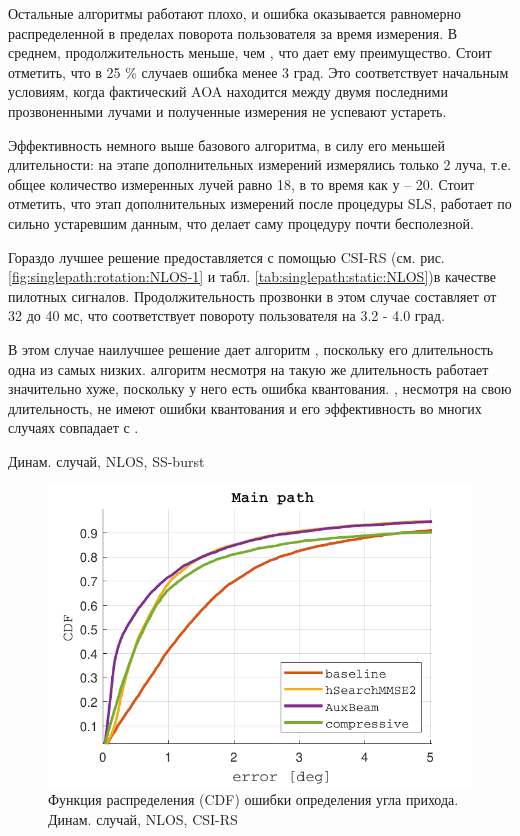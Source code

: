 Остальные алгоритмы работают плохо, и ошибка оказывается равномерно
распределенной в пределах поворота пользователя за время измерения.  В среднем,
продолжительность \AuxBeam{} меньше, чем \hSearchMMSE{}, что дает
ему преимущество. Стоит отметить, что в 25 \% случаев ошибка \AuxBeam{}
менее 3 град. Это соответствует начальным условиям, когда фактический AOA
находится между двумя последними прозвоненными лучами и полученные измерения не успевают
устареть.

Эффективность \hSearchMMSE{} немного выше базового алгоритма, в силу 
его меньшей длительности: на этапе дополнительных измерений измерялись только 2 луча,
т.е. общее количество измеренных лучей равно 18, в то время как у \baseline{} --
20. Стоит отметить, что этап дополнительных измерений после процедуры SLS, работает по сильно 
устаревшим данным, что делает саму процедуру почти бесполезной. 

Гораздо лучшее решение предоставляется с помощью CSI-RS (см. рис.
\ref{fig:singlepath:rotation:NLOS-1} и табл. \ref{tab:singlepath:static:NLOS})в
качестве пилотных сигналов. Продолжительность прозвонки в этом случае составляет
от 32 до 40 мс, что соответствует повороту пользователя на 3.2 - 4.0 град.

В этом случае наилучшее решение дает алгоритм \AuxBeam, поскольку
его длительность одна из самых низких. 
\ACS алгоритм несмотря на такую же длительность работает значительно хуже, 
поскольку у него есть ошибка квантования.
\hSearchMMSE, несмотря на свою длительность, не имеют ошибки квантования и его 
эффективность во многих случаях совпадает с \AuxBeam{}.
\begin{table}[h!]
  \begin{center}
    \caption{Динам. случай, NLOS, SS-burst}
    \small
    \label{tab:singlepath:rotation:NLOS}
  \end{center}
\end{table}

\begin{figure}[ht]
  \centering
  \includegraphics{results/rus/singlepath-rotation-NLOS-CSI-RS-1}
  \caption{Функция распределения (CDF) ошибки определения угла прихода. Динам. случай, NLOS, CSI-RS}
  \label{fig:singlepath:rotation:NLOS-2}
\end{figure}

